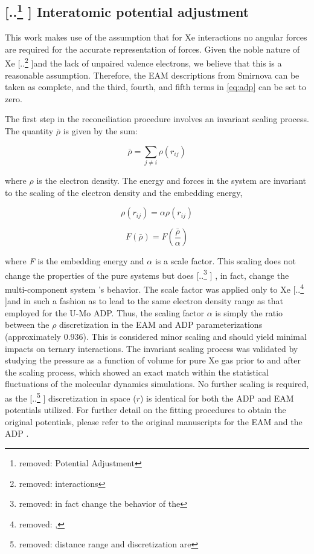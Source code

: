 \documentclass[review]{elsarticle}
\providecommand{\DIFaddtex}[1]{{\protect\color{blue} \sf #1}} %
\providecommand{\DIFdeltex}[1]{{\protect\color{red} [..\footnote{removed: #1} ]}} %
\providecommand{\DIFaddbegin}{} %
\providecommand{\DIFaddend}{} %
\providecommand{\DIFdelbegin}{} %
\providecommand{\DIFdelend}{} %
\providecommand{\DIFadd}[1]{\texorpdfstring{\DIFaddtex{#1}}{#1}} %
\providecommand{\DIFdel}[1]{\texorpdfstring{\DIFdeltex{#1}}{}} %
\newcommand{\DIFscaledelfig}{0.5}
\newlength{\DIFdelgraphicswidth} %
\newlength{\DIFdelgraphicsheight} %
\newcommand{\DIFaddincludegraphics}[2][]{{\color{blue}\fbox{\DIFOincludegraphics[#1]{#2}}}} %
\newcommand{\DIFdelincludegraphics}[2][]{%
\sbox{\DIFdelgraphicsbox}{\DIFOincludegraphics[#1]{#2}}%
\settoboxwidth{\DIFdelgraphicswidth}{\DIFdelgraphicsbox} %
\settoboxtotalheight{\DIFdelgraphicsheight}{\DIFdelgraphicsbox} %
\scalebox{\DIFscaledelfig}{%
\parbox[b]{\DIFdelgraphicswidth}{\usebox{\DIFdelgraphicsbox}\\[-\baselineskip] \rule{\DIFdelgraphicswidth}{0em}}\llap{\resizebox{\DIFdelgraphicswidth}{\DIFdelgraphicsheight}{%
\setlength{\unitlength}{\DIFdelgraphicswidth}%
\begin{picture}(1,1)%
\thicklines\linethickness{2pt} %
{\color[rgb]{1,0,0}\put(0,0){\framebox(1,1){}}}%
{\color[rgb]{1,0,0}\put(0,0){\line( 1,1){1}}}%
{\color[rgb]{1,0,0}\put(0,1){\line(1,-1){1}}}%
\end{picture}%
}\hspace*{3pt}}} %
} %
\DeclareRobustCommand{\DIFaddbegin}{\DIFOaddbegin \let\includegraphics\DIFaddincludegraphics} %
\DeclareRobustCommand{\DIFaddend}{\DIFOaddend \let\includegraphics\DIFOincludegraphics} %
\DeclareRobustCommand{\DIFdelbegin}{\DIFOdelbegin \let\includegraphics\DIFdelincludegraphics} %
\DeclareRobustCommand{\DIFdelend}{\DIFOaddend \let\includegraphics\DIFOincludegraphics} %
\begin{document}
 \subsection{\DIFdelbegin \DIFdel{Potential Adjustment}\DIFdelend \DIFaddbegin \DIFadd{Interatomic potential adjustment}\DIFaddend }

This work makes use of the assumption that for Xe interactions no angular forces are required for the accurate representation of forces. Given the noble nature of Xe \DIFdelbegin \DIFdel{interactions }\DIFdelend and the lack of unpaired valence electrons, we believe that this is a reasonable assumption. Therefore, the EAM descriptions from Smirnova \cite{smirnovaUMoXe} can be taken as complete, and the third, fourth, and fifth terms in \cref{eq:adp} can be set to zero. 

The first step in the reconciliation procedure involves an invariant scaling process. The quantity $\bar{\rho}$ is given by the sum:

\begin{equation}
\bar{\rho} = \sum_{j \neq i} \rho(r_{ij})
\end{equation}

\noindent where $\rho$ is the electron density. The energy and forces in the system are invariant to the scaling of the electron density and the embedding energy,

\begin{equation}
\rho(r_{ij}) = \alpha\rho(r_{ij})
\end{equation}

\begin{equation}
F(\bar{\rho}) = F(\frac{\bar{\rho}}{\alpha}) 
\end{equation}

\noindent where \textit{F} is the embedding energy and $\alpha$ is a scale factor. This scaling does not change the properties of the pure systems but does\DIFdelbegin \DIFdel{in fact change the behavior of the }\DIFdelend \DIFaddbegin \DIFadd{, in fact, change the }\DIFaddend multi-component system\DIFaddbegin \DIFadd{'s behavior}\DIFaddend . The scale factor was applied only to Xe \DIFdelbegin \DIFdel{, }\DIFdelend and in such a fashion as to lead to the same electron density range as that employed for the U-Mo ADP. \DIFaddbegin \DIFadd{Thus, the scaling factor $\alpha$ is simply the ratio between the $\rho$ discretization in the EAM and ADP parameterizations (approximately 0.936). This is considered minor scaling and should yield minimal impacts on ternary interactions. The invariant scaling process was validated by studying the pressure as a function of volume for pure Xe gas prior to and after the scaling process, which showed an exact match within the statistical fluctuations of the molecular dynamics simulations. }\DIFaddend No further scaling is required, as the \DIFdelbegin \DIFdel{distance range and discretization are }\DIFdelend \DIFaddbegin \DIFadd{discretization in space ($r$) is }\DIFaddend identical for both the ADP and EAM potentials utilized. \DIFaddbegin \DIFadd{For further detail on the fitting procedures to obtain the original potentials, please refer to the original manuscripts for the EAM \cite{smirnovaUMoXe} and the ADP \cite{starikov2018}.
}\DIFaddend 
\end{document}
